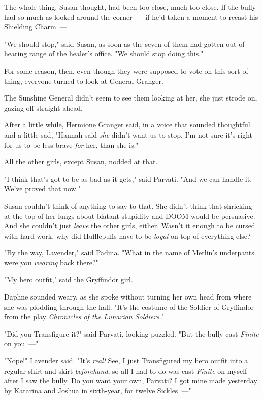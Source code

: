 The whole thing, Susan thought, had been too close, much too close. If the
bully had so much as looked around the corner~--- if he'd taken a moment to
recast his Shielding Charm~---

"We should stop," said Susan, as soon as the seven of them had gotten out of
hearing range of the healer's office. "We should stop doing this."

For some reason, then, even though they were supposed to vote on this sort of
thing, everyone turned to look at General Granger.

The Sunshine General didn't seem to see them looking at her, she just strode
on, gazing off straight ahead.

After a little while, Hermione Granger said, in a voice that sounded thoughtful
and a little sad, "Hannah said \emph{she} didn't want us to stop. I'm not sure
it's right for us to{\el} be less brave \emph{for} her, than she is."

All the other girls, except Susan, nodded at that.

"I think that's got to be as bad as it gets," said Parvati. "And we can handle
it. We've proved that now."

Susan couldn't think of anything to say to that. She didn't think that
shrieking at the top of her lungs about blatant stupidity and DOOM would be
persuasive. And she couldn't just \emph{leave} the other girls, either. Wasn't
it enough to be cursed with hard work, why did Hufflepuffs have to be
\emph{loyal} on top of everything else?

"By the way, Lavender," said Padma. "What in the name of Merlin's underpants
were you \emph{wearing} back there?"

"My hero outfit," said the Gryffindor girl.

Daphne sounded weary, as she spoke without turning her own head from where she
was plodding through the hall. "It's the costume of the Soldier of Gryffindor
from the play \emph{Chronicles of the Lunarian Soldiers}."

"Did you Transfigure it?" said Parvati, looking puzzled. "But the bully cast
\emph{Finite} on you~---"

"Nope!" Lavender said. "It's \emph{real!} See, I just Transfigured my hero
outfit into a regular shirt and skirt \emph{beforehand}, so all I had to do was
cast \emph{Finite} on myself after I saw the bully. Do you want your own,
Parvati? I got mine made yesterday by Katarina and Joshua in sixth-year, for
twelve Sickles~---"

